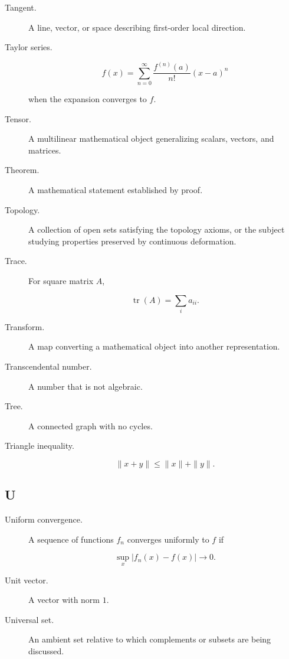 \begin{description}

\item[Tangent.]
A line, vector, or space describing first-order local direction.

\item[Taylor series.]

\[
f(x)
=
\sum_{n=0}^{\infty}
\frac{
f^{(n)}(a)
}{
n!
}
(x-a)^n
\]

when the expansion converges to \(f\).

\item[Tensor.]
A multilinear mathematical object generalizing scalars, vectors, and
matrices.

\item[Theorem.]
A mathematical statement established by proof.

\item[Topology.]
A collection of open sets satisfying the topology axioms, or the subject
studying properties preserved by continuous deformation.

\item[Trace.]
For square matrix \(A\),

\[
\operatorname{tr}(A)
=
\sum_i a_{ii}.
\]

\item[Transform.]
A map converting a mathematical object into another representation.

\item[Transcendental number.]
A number that is not algebraic.

\item[Tree.]
A connected graph with no cycles.

\item[Triangle inequality.]

\[
\|x+y\|
\leq
\|x\|+\|y\|.
\]

\end{description}

\subsection*{U}

\begin{description}

\item[Uniform convergence.]
A sequence of functions \(f_n\) converges uniformly to \(f\) if

\[
\sup_x
|f_n(x)-f(x)|
\to0.
\]

\item[Unit vector.]
A vector with norm \(1\).

\item[Universal set.]
An ambient set relative to which complements or subsets are being discussed.

\end{description}

